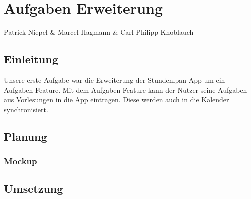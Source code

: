 \chapter{Aufgaben Erweiterung}
Patrick Niepel \& Marcel Hagmann \& Carl Philipp Knoblauch

\section{Einleitung}
Unsere erste Aufgabe war die Erweiterung der Stundenlpan App um ein Aufgaben Feature. Mit dem Aufgaben Feature kann der Nutzer seine Aufgaben aus Vorlesungen in die App eintragen. Diese werden auch in die Kalender synchronisiert.

\section{Planung}


\subsection{Mockup}

\section{Umsetzung}
